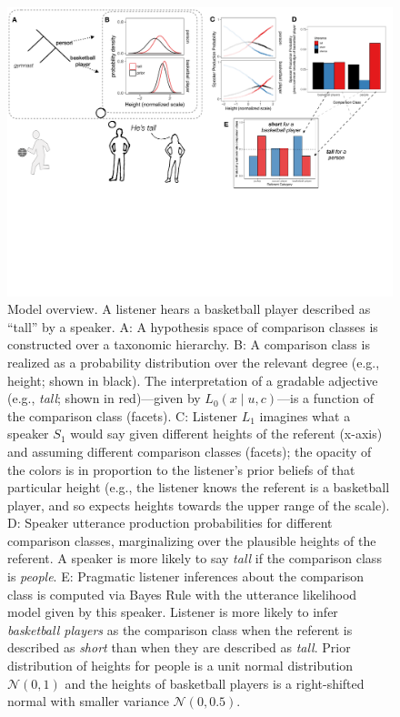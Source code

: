 \documentclass[doc]{apa6}
\begin{document}
\begin{figure}[ht]
\centering
\includegraphics[width=\textwidth]{figs/model_cartoon.pdf}
\caption{\small \label{fig:modelCartoon}Model overview. A listener hears a basketball player described as ``tall'' by a speaker. A: A hypothesis space of comparison classes is constructed over a taxonomic hierarchy. B: A comparison class is realized as a probability distribution over the relevant degree (e.g., height; shown in black). The interpretation of a gradable adjective (e.g., \emph{tall}; shown in red)---given by $L_{0}(x \mid u, c)$---is a function of the comparison class (facets). C: Listener $L_1$ imagines what a speaker $S_1$ would say given different heights of the referent (x-axis) and assuming different comparison classes (facets); the opacity of the colors is in proportion to the listener's prior beliefs of that particular height (e.g., the listener knows the referent is a basketball player, and so expects heights towards the upper range of the scale). D: Speaker utterance production probabilities for different comparison classes, marginalizing over the plausible heights of the referent. A speaker is more likely to say \emph{tall} if the comparison class is \emph{people}. E: Pragmatic listener inferences about the comparison class is computed via Bayes Rule with the utterance likelihood model given by this speaker. Listener is more likely to infer \emph{basketball players} as the comparison class when the referent is described as \emph{short} than when they are described as \emph{tall}. Prior distribution of heights for people is a unit normal distribution $\mathcal{N}(0, 1)$ and the heights of basketball players is a right-shifted normal with smaller variance $\mathcal{N}(0, 0.5)$.
}
\end{figure}
\end{document}
